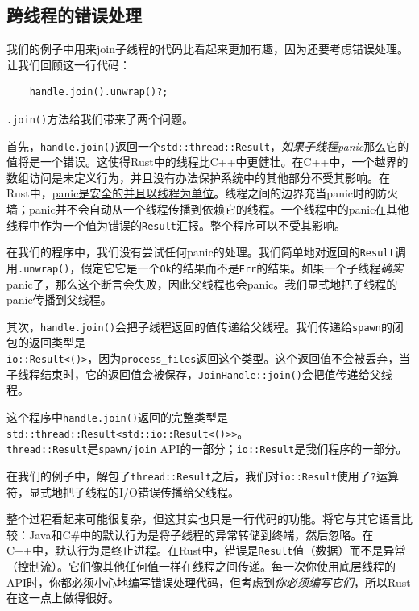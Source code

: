 \subsection{跨线程的错误处理}
我们的例子中用来join子线程的代码比看起来更加有趣，因为还要考虑错误处理。让我们回顾这一行代码：
\begin{verbatim}
    handle.join().unwrap()?;
\end{verbatim}

\texttt{.join()}方法给我们带来了两个问题。

首先，\texttt{handle.join()}返回一个\texttt{std::thread::Result}，\emph{如果子线程panic}那么它的值将是一个错误。这使得Rust中的线程比C++中更健壮。在C++中，一个越界的数组访问是未定义行为，并且没有办法保护系统中的其他部分不受其影响。在Rust中，\hyperref[unwind]{panic是安全的并且以线程为单位}。线程之间的边界充当panic时的防火墙；panic并不会自动从一个线程传播到依赖它的线程。一个线程中的panic在其他线程中作为一个值为错误的\texttt{Result}汇报。整个程序可以不受其影响。

在我们的程序中，我们没有尝试任何panic的处理。我们简单地对返回的\texttt{Result}调用\texttt{.unwrap()}，假定它它是一个\texttt{Ok}的结果而不是\texttt{Err}的结果。如果一个子线程\emph{确实}panic了，那么这个断言会失败，因此父线程也会panic。我们显式地把子线程的panic传播到父线程。

其次，\texttt{handle.join()}会把子线程返回的值传递给父线程。我们传递给\texttt{spawn}的闭包的返回类型是\\
\texttt{io::Result<()>}，因为\texttt{process\_files}返回这个类型。这个返回值不会被丢弃，当子线程结束时，它的返回值会被保存，\texttt{JoinHandle::join()}会把值传递给父线程。

这个程序中\texttt{handle.join()}返回的完整类型是\texttt{std::thread::Result<std::io::Result<()>>}。\\
\texttt{thread::Result}是\texttt{spawn/join} API的一部分；\texttt{io::Result}是我们程序的一部分。

在我们的例子中，解包了\texttt{thread::Result}之后，我们对\texttt{io::Result}使用了\texttt{?}运算符，显式地把子线程的I/O错误传播给父线程。

整个过程看起来可能很复杂，但这其实也只是一行代码的功能。将它与其它语言比较：Java和C\#中的默认行为是将子线程的异常转储到终端，然后忽略。在C++中，默认行为是终止进程。在Rust中，错误是\texttt{Result}值（数据）而不是异常（控制流）。它们像其他任何值一样在线程之间传递。每一次你使用底层线程的API时，你都必须小心地编写错误处理代码，但考虑到\emph{你必须编写它们}，所以Rust在这一点上做得很好。

